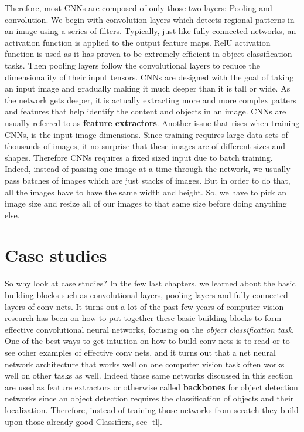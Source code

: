 Therefore, most CNNs are composed of only those two layers: Pooling and convolution. We begin with convolution layers which detects regional patterns
in an image using a series of filters. Typically, just like fully connected networks, an activation function is applied to the output feature maps.
RelU activation function is used as it has proven to be extremely efficient in object classification tasks. Then pooling layers follow the
convolutional layers to reduce the dimensionality of their input tensors. CNNs are designed with the goal of taking an input image and gradually
making it much deeper than it is tall or wide. As the network gets deeper, it is actually extracting more and more complex patters and features that
help identify the content and objects in an image. CNNs are usually referred to as \textbf{feature extractors}. Another issue that rises when
training CNNs, is the input image dimensions. Since training requires large data-sets of thousands of images, it no surprise that these images
are of different sizes and shapes. Therefore CNNs requires a fixed sized input due to batch training. Indeed, instead of passing one image at a time
through the network, we usually pass batches of images which are just stacks of images. But in order to do that, all the images have to have the
same width and height. So, we have to pick an image size and resize all of our images to that same size before doing anything else.

\section{Case studies}

So why look at case studies? In the few last chapters, we learned about the basic building blocks such as convolutional layers, pooling layers and fully connected layers of conv nets. It turns out a lot of the past few years of computer vision research has been on how to put together these basic building blocks to form effective convolutional neural networks, focusing on the \emph{object classification task}. One of the best ways to get intuition on how to build conv nets is to read or to see other examples of effective conv nets, and it turns out that a net neural network architecture that works well on one computer vision task often works well on other tasks as well. Indeed those same networks discussed in this section are used as feature extractors or otherwise called \textbf{backbones} for object detection networks since an object detection requires the classification of objects and their localization. Therefore, instead of training those networks from scratch they build upon those already good Classifiers, see \cref{tl}.

